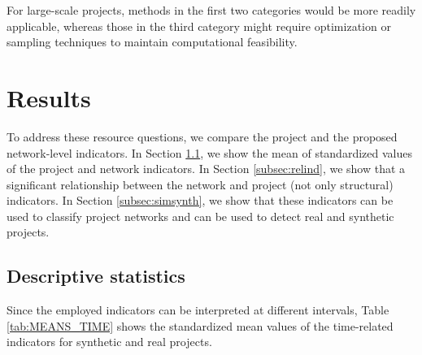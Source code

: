 \documentclass[preprint,
3p]{elsarticle} %
\begin{document}
For large-scale projects, methods in the first two categories would be
more readily applicable, whereas those in the third category might
require optimization or sampling techniques to maintain computational
feasibility.

\section{Results}\label{sec:results}

To address these resource questions, we compare the project and the
proposed network-level indicators. In Section \ref{subsec:descriptives},
we show the mean of standardized values of the project and network
indicators. In Section \ref{subsec:relind}, we show that a significant
relationship between the network and project (not only structural)
indicators. In Section \ref{subsec:simsynth}, we show that these
indicators can be used to classify project networks and can be used to
detect real and synthetic projects.

\subsection{Descriptive statistics}\label{subsec:descriptives}

Since the employed indicators can be interpreted at different intervals,
Table \ref{tab:MEANS_TIME} shows the standardized mean values of the
time-related indicators for synthetic and real projects.
\end{document}
